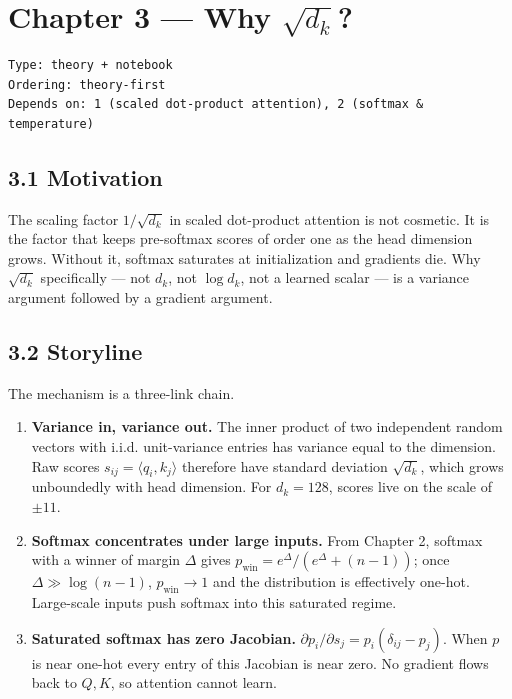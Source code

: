 \documentclass[
]{article}
\author{}
\date{}
\begin{document}
\hypertarget{chapter-3-why-sqrtd_k}{%
\section{\texorpdfstring{Chapter 3 --- Why
\(\sqrt{d_k}\)?}{Chapter 3 --- Why \textbackslash sqrt\{d\_k\}?}}\label{chapter-3-why-sqrtd_k}}

\begin{verbatim}
Type: theory + notebook
Ordering: theory-first
Depends on: 1 (scaled dot-product attention), 2 (softmax & temperature)
\end{verbatim}

\hypertarget{motivation}{%
\subsection{3.1 Motivation}\label{motivation}}

The scaling factor \(1/\sqrt{d_k}\) in scaled dot-product attention is
not cosmetic. It is the factor that keeps pre-softmax scores of order
one as the head dimension grows. Without it, softmax saturates at
initialization and gradients die. Why \(\sqrt{d_k}\) specifically ---
not \(d_k\), not \(\log d_k\), not a learned scalar --- is a variance
argument followed by a gradient argument.

\hypertarget{storyline}{%
\subsection{3.2 Storyline}\label{storyline}}

The mechanism is a three-link chain.

\begin{enumerate}
\def\labelenumi{\arabic{enumi}.}
\item
  \textbf{Variance in, variance out.} The inner product of two
  independent random vectors with i.i.d. unit-variance entries has
  variance equal to the dimension. Raw scores
  \(s_{ij} = \langle q_i, k_j \rangle\) therefore have standard
  deviation \(\sqrt{d_k}\), which grows unboundedly with head dimension.
  For \(d_k = 128\), scores live on the scale of \(\pm 11\).
\item
  \textbf{Softmax concentrates under large inputs.} From Chapter 2,
  softmax with a winner of margin \(\Delta\) gives
  \(p_{\text{win}} = e^\Delta / (e^\Delta + (n-1))\); once
  \(\Delta \gg \log(n-1)\), \(p_{\text{win}} \to 1\) and the
  distribution is effectively one-hot. Large-scale inputs push softmax
  into this saturated regime.
\item
  \textbf{Saturated softmax has zero Jacobian.}
  \(\partial p_i / \partial s_j = p_i(\delta_{ij} - p_j)\). When \(p\)
  is near one-hot every entry of this Jacobian is near zero. No gradient
  flows back to \(Q, K\), so attention cannot learn.
\end{enumerate}
\end{document}
